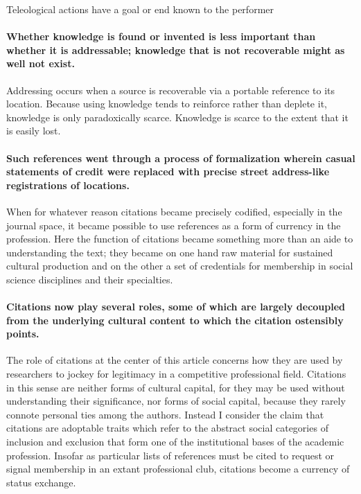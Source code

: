 \documentclass[]{article}
\begin{document}
Teleological actions have a goal or end known to the performer

\paragraph{Whether knowledge is found or invented is less important than
whether it is addressable; knowledge that is not recoverable might as
well not
exist.}\label{whether-knowledge-is-found-or-invented-is-less-important-than-whether-it-is-addressable-knowledge-that-is-not-recoverable-might-as-well-not-exist.}

Addressing occurs when a source is recoverable via a portable reference
to its location. Because using knowledge tends to reinforce rather than
deplete it, knowledge is only paradoxically scarce. Knowledge is scarce
to the extent that it is easily lost.

\paragraph{Such references went through a process of formalization
wherein casual statements of credit were replaced with precise street
address-like registrations of
locations.}\label{such-references-went-through-a-process-of-formalization-wherein-casual-statements-of-credit-were-replaced-with-precise-street-address-like-registrations-of-locations.}

When for whatever reason citations became precisely codified, especially
in the journal space, it became possible to use references as a form of
currency in the profession. Here the function of citations became
something more than an aide to understanding the text; they became on
one hand raw material for sustained cultural production and on the other
a set of credentials for membership in social science disciplines and
their specialties.

\paragraph{Citations now play several roles, some of which are largely
decoupled from the underlying cultural content to which the citation
ostensibly
points.}\label{citations-now-play-several-roles-some-of-which-are-largely-decoupled-from-the-underlying-cultural-content-to-which-the-citation-ostensibly-points.}

The role of citations at the center of this article concerns how they
are used by researchers to jockey for legitimacy in a competitive
professional field. Citations in this sense are neither forms of
cultural capital, for they may be used without understanding their
significance, nor forms of social capital, because they rarely connote
personal ties among the authors. Instead I consider the claim that
citations are adoptable traits which refer to the abstract social
categories of inclusion and exclusion that form one of the institutional
bases of the academic profession. Insofar as particular lists of
references must be cited to request or signal membership in an extant
professional club, citations become a currency of status exchange.
\end{document}
